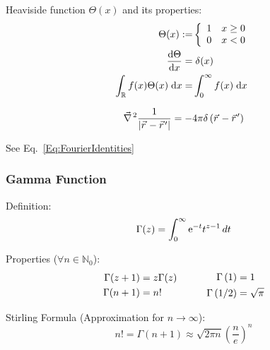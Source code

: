 			\noindent
			Heaviside function $\Theta(x)$ and its properties:
			\begin{equation}
				\begin{aligned}
					\Theta(x) :=& \left\{\begin{array}{ll}
						1 & x\ge 0 \\
						0 & x<0 \\
						\end{array}\right. \\
						\dv{\Theta}{x}(x) =&\; \delta(x) \\
					\int_{\mathbb{R}} f(x)\Theta(x)\;\dd x =& \int_{0}^{\infty} f(x)\;\dd x
				\end{aligned}
			\end{equation}

			\begin{equation}
				\Nabla^2\frac{1}{\abs{\vec{r} - \vec{r}'}} = -4\pi\delta\left(\vec{r} - \vec{r}'\right)
			\end{equation}

			\noindent
			See Eq.~\ref{Eq:FourierIdentities}

		\subsubsection{Gamma Function}
			\noindent
			Definition:
			\begin{equation}
				\Gamma(z)=\int_0^{\infty}\mathrm{e}^{-t}t^{z-1}\,dt
			\end{equation}

			\noindent
			Properties ($\forall n\in\mathbb{N}_0$):
			\begin{equation}
				\begin{aligned}
					\Gamma(z+1)&=z\Gamma(z) \\
					\Gamma(n+1) &= n!
				\end{aligned}
				\hspace{30pt}
				\begin{aligned}
					\Gamma\left(1 \right)&=1 \\
					\Gamma\left(1/2 \right)&=\sqrt{\pi} \\
				\end{aligned}
			\end{equation}

			\noindent
			Stirling Formula (Approximation for $n\rightarrow\infty$):
			\begin{equation}
				n! = \Gamma(n+1) \approx \sqrt{2\pi n} \left( \frac{n}{e} \right)^{n}
			\end{equation}

